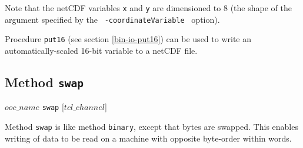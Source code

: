 Note that the netCDF variables \texttt{x} and \texttt{y} 
are dimensioned to 8 (the shape of the argument
  specified by the 
  \mbox{
    \texttt{-coordinateVariable}
  } option).
  
Procedure \texttt{put16}
(see section  \ref{bin-io-put16})
can be used to write an automatically-scaled 16-bit variable to
  a netCDF file.

\subsection{Method \texttt{swap}}
    \label{ooc-write-swap}

  $ooc\_name$ \texttt{swap} [$tcl\_channel$]

Method 
  \texttt{swap} is like method 
  \texttt{binary}, except that bytes are swapped. This enables
  writing of data to be read on a machine with opposite byte-order
  within words.
